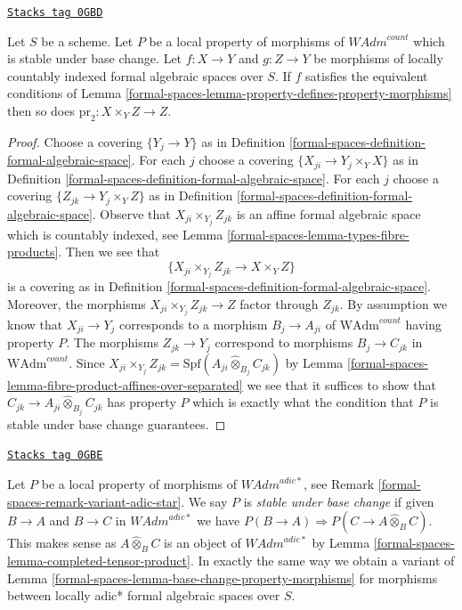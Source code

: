 \begin{lemma}
\label{formal-spaces-lemma-base-change-property-morphisms}
\href{https://stacks.math.columbia.edu/tag/0GBD}{\texttt{Stacks tag 0GBD}}

Let $S$ be a scheme. Let $P$ be a local property of morphisms of
$\textit{WAdm}^{count}$ which is stable under base change.
Let $f : X \to Y$ and $g : Z \to Y$ be morphisms of locally countably indexed
formal algebraic spaces over $S$. If $f$ satisfies the equivalent conditions of
Lemma \ref{formal-spaces-lemma-property-defines-property-morphisms}
then so does $\text{pr}_2 : X \times_Y Z \to Z$.
\end{lemma}

\begin{proof}
Choose a covering $\{Y_j \to Y\}$ as in
Definition \ref{formal-spaces-definition-formal-algebraic-space}.
For each $j$ choose a covering $\{X_{ji} \to Y_j \times_Y X\}$
as in Definition \ref{formal-spaces-definition-formal-algebraic-space}.
For each $j$ choose a covering $\{Z_{jk} \to Y_j \times_Y Z\}$
as in Definition \ref{formal-spaces-definition-formal-algebraic-space}.
Observe that $X_{ji} \times_{Y_j} Z_{jk}$ is an
affine formal algebraic space which is countably indexed, see
Lemma \ref{formal-spaces-lemma-types-fibre-products}.
Then we see that
$$
\{X_{ji} \times_{Y_j} Z_{jk} \to X \times_Y Z\}
$$
is a covering as in Definition \ref{formal-spaces-definition-formal-algebraic-space}.
Moreover, the morphisms $X_{ji} \times_{Y_j} Z_{jk} \to Z$
factor through $Z_{jk}$. By assumption we know that
$X_{ji} \to Y_j$ corresponds to a morphism $B_j \to A_{ji}$ of
$\text{WAdm}^{count}$ having property $P$.
The morphisms $Z_{jk} \to Y_j$ correspond to morphisms $B_j \to C_{jk}$ in
$\text{WAdm}^{count}$. Since
$X_{ji} \times_{Y_j} Z_{jk} =
\text{Spf}(A_{ji} \widehat{\otimes}_{B_j} C_{jk})$
by Lemma \ref{formal-spaces-lemma-fibre-product-affines-over-separated}
we see that it suffices to show that
$C_{jk} \to A_{ji} \widehat{\otimes}_{B_j} C_{jk}$
has property $P$ which is exactly what
the condition that $P$ is stable under base change guarantees.
\end{proof}

\begin{remark}

\label{formal-spaces-remark-base-change-variant-adic-star}
\href{https://stacks.math.columbia.edu/tag/0GBE}{\texttt{Stacks tag 0GBE}}

Let $P$ be a local property of morphisms of $\textit{WAdm}^{adic*}$, see
Remark \ref{formal-spaces-remark-variant-adic-star}. We say $P$ is {\it stable under
base change} if given $B \to A$ and $B \to C$ in $\textit{WAdm}^{adic*}$
we have $P(B \to A) \Rightarrow P(C \to A \widehat{\otimes}_B C)$.
This makes sense as $A \widehat{\otimes}_B C$ is an object of
$\textit{WAdm}^{adic*}$ by Lemma \ref{formal-spaces-lemma-completed-tensor-product}.
In exactly the same way we obtain a variant of
Lemma \ref{formal-spaces-lemma-base-change-property-morphisms}
for morphisms between locally adic* formal algebraic spaces over $S$.
\end{remark}

